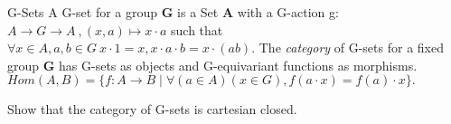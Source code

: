 \begin{definition}{G-Sets}
  A G-set for a group \textbf{G} is a Set \textbf{A} with a G-action g: $A \rightarrow G \rightarrow A \ , (x,a) \mapsto x\cdot a$ such that $\forall x \in A, a,b \in G \ x\cdot 1=x, x\cdot a \cdot b = x\cdot (ab)$.
  The \emph{category} of G-sets for a fixed group \textbf{G} has G-sets as objects and G-equivariant functions as morphisms. $ Hom(A,B) = \{ f:A \rightarrow B \mid \forall (a \in A)(x \in G), f(a\cdot x) = f(a)\cdot x\}. $
\end{definition}

\begin{exercise}
  Show that the category of G-sets is cartesian closed.
\end{exercise}




